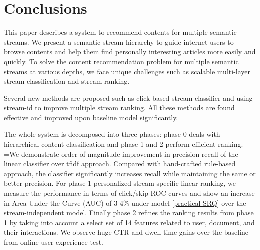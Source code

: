 \documentclass{sig-alternate}
\begin{document}
\section{Conclusions}
\label{sec:conclusions}
This paper describes a system to recommend contents for multiple semantic 
streams.
 We present a semantic stream hierarchy to guide internet users to  browse 
 contents and help them find personally interesting articles more easily and 
 quickly. To solve the content recommendation problem for multiple semantic 
 streams at various depths, we face unique challenges such as scalable 
 multi-layer stream classification and stream ranking. 


Several new methods are proposed such as click-based stream classifier and 
using stream-id to improve multiple stream ranking.  All these methods are 
found effective and improved upon baseline model significantly.  


The whole system is decomposed into three phases: phase 0 deals with 
hierarchical content classification and phase 1 and 2 perform efficient 
ranking. =We demonstrate order of magnitude improvement in precision-recall of 
the 
linear classifier over tfidf approach. Compared with hand-crafted rule-based 
approach, the classifier significantly increases recall while maintaining the 
same or better precision. For phase 1 personalized stream-specific linear 
ranking, we measure the performance in terms of click/skip ROC curves and show 
an increase in Area Under the Curve (AUC) of 3-4\% under model 
\eqref{practical SRQ}  over the stream-independent model. Finally phase 2 
refines the ranking results from phase 1 by taking into account a select set 
of 14 features related to user, document, and their interactions. We observe 
huge CTR and dwell-time gains over the baseline from online user experience 
test.
\end{document}
